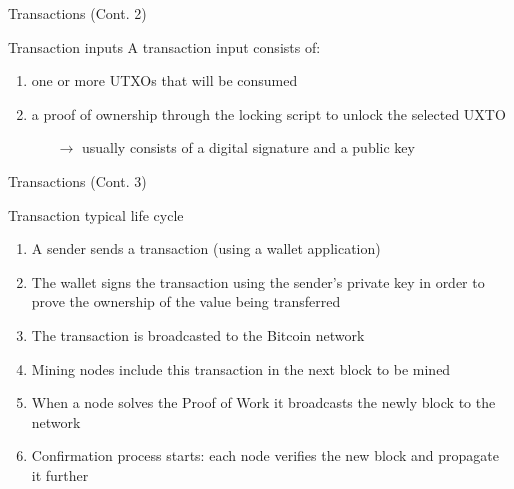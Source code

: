 \documentclass{beamer}
\begin{document}
  \begin{frame}{Transactions (Cont. 2)}
    \begin{block}{Transaction inputs}
      A transaction input consists of: 
      \begin{enumerate}
        \item one or more UTXOs that will be consumed 
        \item a proof of ownership through the locking script to unlock the selected UXTO \pause
        \begin{itemize}
          \item[$\rightarrow$] usually consists of a digital signature and a public key
        \end{itemize}
      \end{enumerate}
    \end{block}
  \end{frame}





  \begin{frame}{Transactions (Cont. 3)}
    \begin{block}{Transaction typical life cycle}
      \begin{enumerate}
        \item A sender sends a transaction (using a wallet application) 
        \item The wallet signs the transaction using the sender’s private key in order
        to prove the ownership of the value being transferred 
        \item The transaction is broadcasted to the Bitcoin network 
        \item Mining nodes include this transaction in the next block to be mined 
        \item When a node solves the Proof of Work it broadcasts the
        newly block to the network 
        \item Confirmation process starts: each node verifies the new block and propagate it further
      \end{enumerate}
    \end{block}
  \end{frame}
\end{document}
